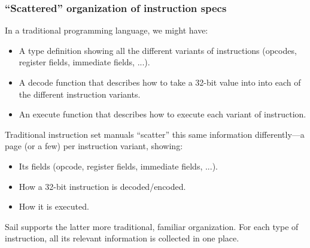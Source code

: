 \documentclass[aspectratio=169]{beamer}
\newcommand{\slidefont}{\scriptsize}
\begin{document}
\begin{frame}[fragile]
  \frametitle{``Scattered'' organization of instruction specs}

  \slidefont

  In a traditional programming language, we might have:
  \begin{itemize}
  \item A type definition showing all the different variants of
      instructions (opcodes, register fields, immediate fields, ...).

    \item A decode function that describes how to take a 32-bit value
      into into each of the different instruction variants.

    \item An execute function that describes how to execute each variant of instruction.
  \end{itemize}

  \vspace{1ex}

  Traditional instruction set manuals ``scatter'' this same
  information differently---a page (or a few) per instruction variant,
  showing:

  \begin{itemize}
    \item Its fields (opcode, register fields, immediate fields, ...).
    \item How a 32-bit instruction is decoded/encoded.
    \item How it is executed.
  \end{itemize}

  \vspace{1ex}

  Sail supports the latter more traditional, familiar organization.
  For each type of instruction, all its relevant information is
  collected in one place.

\end{frame}

\end{document}
